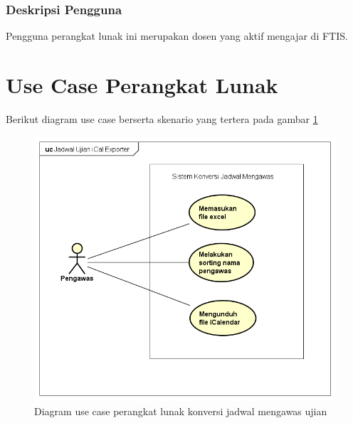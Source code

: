 \subsubsection{Deskripsi Pengguna}
Pengguna perangkat lunak ini merupakan dosen yang aktif mengajar di FTIS.
	
\section{Use Case Perangkat Lunak}

Berikut diagram use case berserta skenario yang tertera pada gambar \ref{fig:useCaseJadwal}

\begin{figure}[h]
	\centering
	\includegraphics[scale=0.5]{Gambar/useCaseJadwal}
	\caption{Diagram use case perangkat lunak konversi jadwal mengawas ujian}
	\label{fig:useCaseJadwal}
	\end{figure}

